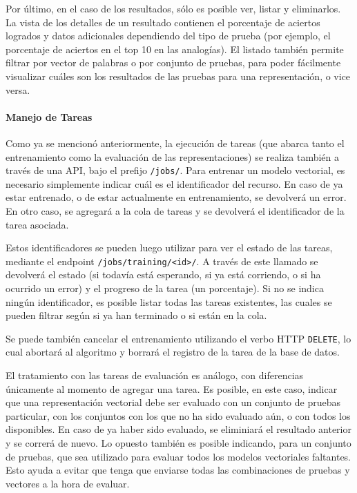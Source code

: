 Por último, en el caso de los resultados, sólo es posible ver, listar y eliminarlos. La vista de los
detalles de un resultado contienen el porcentaje de aciertos logrados y datos adicionales
dependiendo del tipo de prueba (por ejemplo, el porcentaje de aciertos en el top 10 en las
analogías). El listado también permite filtrar por vector de palabras o por conjunto de pruebas,
para poder fácilmente visualizar cuáles son los resultados de las pruebas para una representación, o
vice versa.


\paragraph{Manejo de Tareas}

Como ya se mencionó anteriormente, la ejecución de tareas (que abarca tanto el entrenamiento como la
evaluación de las representaciones) se realiza también a través de una API, bajo el prefijo
\texttt{/jobs/}. Para entrenar un modelo vectorial, es necesario simplemente indicar cuál es el
identificador del recurso. En caso de ya estar entrenado, o de estar actualmente en entrenamiento,
se devolverá un error. En otro caso, se agregará a la cola de tareas y se devolverá el identificador
de la tarea asociada.

Estos identificadores se pueden luego utilizar para ver el estado de las tareas, mediante el
endpoint \texttt{/jobs/training/<id>/}. A través de este llamado se devolverá el estado (si todavía
está esperando, si ya está corriendo, o si ha ocurrido un error) y el progreso de la tarea (un
porcentaje). Si no se indica ningún identificador, es posible listar todas las tareas existentes,
las cuales se pueden filtrar según si ya han terminado o si están en la cola.

Se puede también cancelar el entrenamiento utilizando el verbo HTTP \texttt{DELETE}, lo cual
abortará al algoritmo y borrará el registro de la tarea de la base de datos.

El tratamiento con las tareas de evaluación es análogo, con diferencias únicamente al momento de
agregar una tarea. Es posible, en este caso, indicar que una representación vectorial debe ser
evaluado con un conjunto de pruebas particular, con los conjuntos con los que no ha sido evaluado
aún, o con todos los disponibles. En caso de ya haber sido evaluado, se eliminiará el resultado
anterior y se correrá de nuevo. Lo opuesto también es posible indicando, para un conjunto de
pruebas, que sea utilizado para evaluar todos los modelos vectoriales faltantes. Esto ayuda a evitar
que tenga que enviarse todas las combinaciones de pruebas y vectores a la hora de evaluar.


